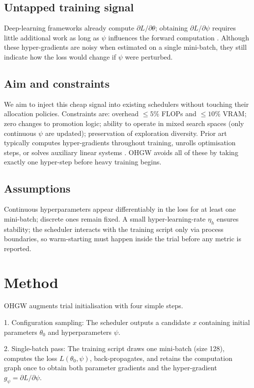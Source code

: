 \documentclass{article}
\begin{document}
\subsection{Untapped training signal}
Deep-learning frameworks already compute \(\partial L/\partial \theta\); obtaining \(\partial L/\partial \psi\) requires little additional work as long as \(\psi\) influences the forward computation \cite{chandra-2019-gradient}. Although these hyper-gradients are noisy when estimated on a single mini-batch, they still indicate how the loss would change if \(\psi\) were perturbed.

\subsection{Aim and constraints}
We aim to inject this cheap signal into existing schedulers without touching their allocation policies. Constraints are: overhead \(\leq 5 \%\) FLOPs and \(\leq 10 \%\) VRAM; zero changes to promotion logic; ability to operate in mixed search spaces (only continuous \(\psi\) are updated); preservation of exploration diversity. Prior art typically computes hyper-gradients throughout training, unrolls optimisation steps, or solves auxiliary linear systems \cite{bertrand-2020-implicit,immer-2023-stochastic}. OHGW avoids all of these by taking exactly one hyper-step before heavy training begins.

\subsection{Assumptions}
Continuous hyperparameters appear differentiably in the loss for at least one mini-batch; discrete ones remain fixed. A small hyper-learning-rate \(\eta_h\) ensures stability; the scheduler interacts with the training script only via process boundaries, so warm-starting must happen inside the trial before any metric is reported.

\section{Method}
OHGW augments trial initialisation with four simple steps.

1. Configuration sampling: The scheduler outputs a candidate \(x\) containing initial parameters \(\theta_0\) and hyperparameters \(\psi\).

2. Single-batch pass: The training script draws one mini-batch (size 128), computes the loss \(L(\theta_0,\psi)\), back-propagates, and retains the computation graph once to obtain both parameter gradients and the hyper-gradient \(g_\psi = \partial L/\partial \psi\).
\end{document}
